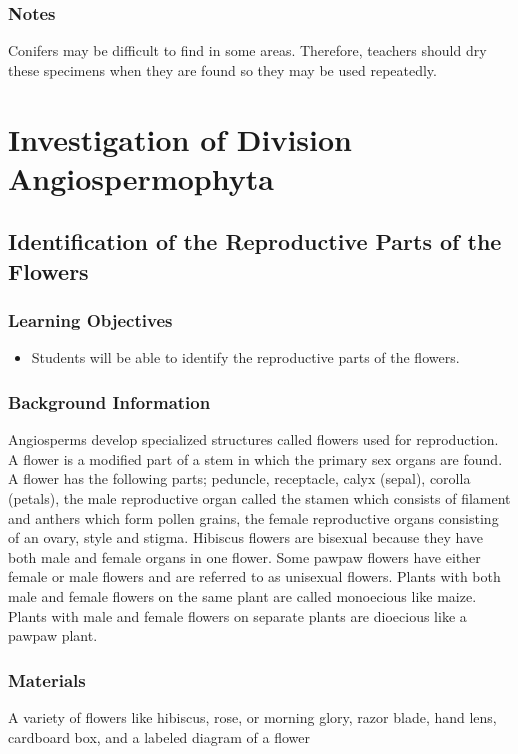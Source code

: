 \subsubsection*{Notes}
Conifers may be difficult to find in some areas. Therefore, teachers should dry these specimens when they are found so they may be used repeatedly.


\section{Investigation of Division Angiospermophyta}

\subsection{Identification of the Reproductive Parts of the Flowers}

\subsubsection*{Learning Objectives}
\begin{itemize}
\item{Students will be able to identify the reproductive parts of the flowers.}
\end{itemize}

\subsubsection*{Background Information}
Angiosperms develop specialized structures called flowers used for reproduction. A flower is a modified part of a stem in which the primary sex organs are found. A flower has the following parts; peduncle, receptacle, calyx (sepal), corolla (petals), the male reproductive organ called the stamen which consists of filament and anthers which form pollen grains, the female reproductive organs consisting of an ovary, style and stigma. Hibiscus flowers are bisexual because they have both male and female organs in one flower. Some pawpaw flowers have either female or male flowers and are referred to as unisexual flowers. Plants with both male and female flowers on the same plant are called monoecious like maize. Plants with male and female flowers on separate plants are dioecious like a pawpaw plant.

\subsubsection*{Materials}
A variety of flowers like hibiscus, rose, or morning glory, razor blade, hand lens, cardboard box, and a labeled diagram of a flower

